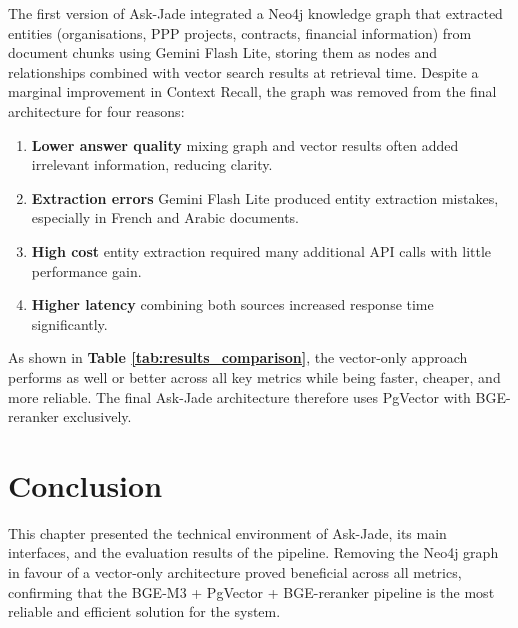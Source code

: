 The first version of Ask-Jade integrated a Neo4j knowledge graph that
extracted entities (organisations, PPP projects, contracts, financial
information) from document chunks using Gemini Flash Lite, storing them
as nodes and relationships combined with vector search results at
retrieval time. Despite a marginal improvement in Context Recall, the
graph was removed from the final architecture for four reasons:

\begin{enumerate}
  \item \textbf{Lower answer quality} mixing graph and vector results
        often added irrelevant information, reducing clarity.
  \item \textbf{Extraction errors} Gemini Flash Lite produced entity
        extraction mistakes, especially in French and Arabic documents.
  \item \textbf{High cost} entity extraction required many additional
        API calls with little performance gain.
  \item \textbf{Higher latency} combining both sources increased
        response time significantly.
\end{enumerate}

As shown in \textbf{Table \ref{tab:results_comparison}}, the vector-only approach
performs as well or better across all key metrics while being faster,
cheaper, and more reliable. The final Ask-Jade architecture therefore
uses PgVector with BGE-reranker exclusively.



\section{Conclusion}
This chapter presented the technical environment of Ask-Jade, its main 
interfaces, and the evaluation results of the pipeline. Removing the Neo4j 
graph in favour of a vector-only architecture proved beneficial across all 
metrics, confirming that the BGE-M3 + PgVector + BGE-reranker pipeline 
is the most reliable and efficient solution for the system.
